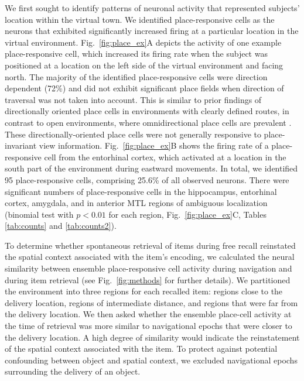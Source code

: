 We first sought to identify patterns of neuronal activity that represented subjects' location within the virtual town. We identified place-responsive cells as the neurons that exhibited significantly increased firing at a particular location in the virtual environment. Fig.~\ref{fig:place_ex}A depicts the activity of one example place-responsive cell, which increased its firing rate when the subject was positioned at a location on the left side of the virtual environment and facing north.  The majority of the identified place-responsive cells were direction dependent (72\%) and did not exhibit significant place fields when direction of traversal was not taken into account.  This is similar to prior findings of directionally oriented place cells in environments with clearly defined routes, in contrast to open environments, where omnidirectional place cells are prevalent \cite{MullEtal94,EkstEtal03}.  These directionally-oriented place cells were not generally responsive to place-invariant view information. Fig.~\ref{fig:place_ex}B shows the firing rate of a place-responsive cell from the entorhinal cortex, which activated at a location in the south part of the environment during eastward movements.  In total, we identified 95 place-responsive cells, comprising 25.6\% of all observed neurons. There were significant numbers of place-responsive cells in the hippocampus, entorhinal cortex, amygdala, and in anterior MTL regions of ambiguous localization (binomial test with $p<0.01$ for each region, Fig.~\ref{fig:place_ex}C, Tables \ref{tab:counts} and \ref{tab:counts2}).

To determine whether spontaneous retrieval of items during free recall reinstated the spatial context associated with the item's encoding, we calculated the neural similarity between ensemble place-responsive cell activity during navigation and during item retrieval (see Fig.~\ref{fig:methods} for further details).  We partitioned the environment into three regions for each recalled item: regions close to the delivery location, regions of intermediate distance, and regions that were far from the delivery location.  We then asked whether the ensemble place-cell activity at the time of retrieval was more similar to navigational epochs that were closer to the delivery location.  A high degree of similarity would indicate the reinstatement of the spatial context associated with the item.  To protect against potential confounding between object and spatial context, we excluded navigational epochs surrounding the delivery of an object.  

